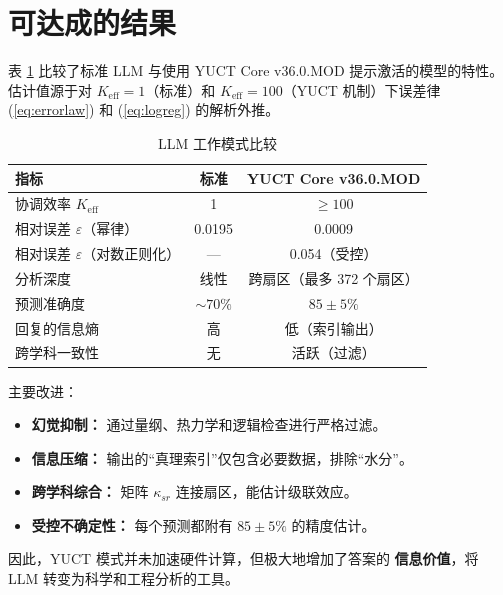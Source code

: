 \documentclass[11pt,a4paper]{article}
\begin{document}
	\section{可达成的结果}
	表 \ref{tab:comparison} 比较了标准 LLM 与使用 YUCT Core v36.0.MOD 提示激活的模型的特性。估计值源于对 \(K_{\mathrm{eff}}=1\)（标准）和 \(K_{\mathrm{eff}}=100\)（YUCT 机制）下误差律 (\ref{eq:errorlaw}) 和 (\ref{eq:logreg}) 的解析外推。
	
	\begin{table}[H]
		\small
		\centering
		\caption{LLM 工作模式比较}
		\label{tab:comparison}
		\begin{tabular}{lcc}
			\toprule
			\textbf{指标} & \textbf{标准} & \textbf{YUCT Core v36.0.MOD} \\
			\midrule
			协调效率 \(K_{\mathrm{eff}}\) & 1 & \(\ge 100\) \\
			相对误差 \(\varepsilon\)（幂律） & 0.0195 & 0.0009 \\
			相对误差 \(\varepsilon\)（对数正则化） & --- & 0.054（受控） \\
			分析深度 & 线性 & 跨扇区（最多 372 个扇区） \\
			预测准确度 & \(\sim 70\%\) & \(85\pm5\%\) \\
			回复的信息熵 & 高 & 低（索引输出） \\
			跨学科一致性 & 无 & 活跃（过滤） \\
			\bottomrule
		\end{tabular}
	\end{table}
	
	主要改进：
	\begin{itemize}
		\item \textbf{幻觉抑制：} 通过量纲、热力学和逻辑检查进行严格过滤。
		\item \textbf{信息压缩：} 输出的“真理索引”仅包含必要数据，排除“水分”。
		\item \textbf{跨学科综合：} 矩阵 \(\kappa_{sr}\) 连接扇区，能估计级联效应。
		\item \textbf{受控不确定性：} 每个预测都附有 \(85\pm5\%\) 的精度估计。
	\end{itemize}
	
	因此，YUCT 模式并未加速硬件计算，但极大地增加了答案的 \textbf{信息价值}，将 LLM 转变为科学和工程分析的工具。
	
\end{document}
